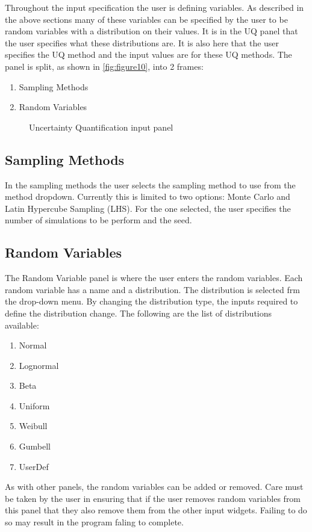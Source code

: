 Throughout the input specification the user is defining variables. As
described in the above sections many of these variables can be
specified by the user to be random variables with a distribution on
their values. It is in the UQ panel that the user specifies what these
distributions are.
It is also here that the user specifies the UQ method and the input
values are for these UQ methods.  The panel is split, as shown
in \autoref{fig:figure10}, into 2 frames:

\begin{enumerate}
\item Sampling Methods 
\item Random Variables
\end{enumerate}

\begin{figure}[!htbp]
  \caption{Uncertainty Quantification input panel}
  \label{fig:figure10}
\end{figure}

\subsection{Sampling Methods}
In the sampling methods the user selects the sampling method to use
from the method dropdown. Currently this is limited to two options:
Monte Carlo and Latin Hypercube Sampling (LHS). For the one selected,
the user specifies the number of simulations to be perform and the
seed.

\subsection{Random Variables}
The Random Variable panel is where the user enters the random
variables. Each random variable has a name and a distribution. The
distribution is selected frm the drop-down menu. By changing the
distribution type, the inputs required to define the distribution
change. The following are the list of distributions available:
\begin{enumerate}
\item Normal
\item Lognormal
\item Beta
\item Uniform
\item Weibull
\item Gumbell
\item UserDef
\end{enumerate} 

As with other panels, the random variables can be added or
removed. Care must be taken by the user in ensuring that if the user
removes random variables from this panel that they also remove them
from the other input widgets. Failing to do so may result in the
program faling to complete.
